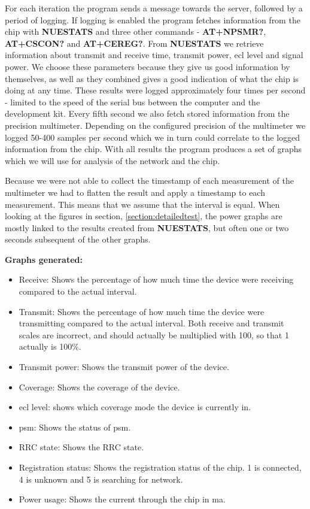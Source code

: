 \documentclass[USenglish]{ifimaster}  %
\begin{document}
For each iteration the program sends a message towards the server, followed by a period of logging. If logging is enabled the program fetches information from the chip with \textbf{NUESTATS} and three other commands - \textbf{AT+NPSMR?}, \textbf{AT+CSCON?} and \textbf{AT+CEREG?}. From \textbf{NUESTATS} we retrieve information about transmit and receive time, transmit power, \acrshort{ecl} level and signal power. We choose these parameters because they give us good information by themselves, as well as they combined gives a good indication of what the chip is doing at any time. These results were logged approximately four times per second - limited to the speed of the serial bus between the computer and the development kit. Every fifth second we also fetch stored information from the precision multimeter. Depending on the configured precision of the multimeter we logged 50-400 samples per second which we in turn could correlate to the logged information from the chip. With all results the program produces a set of graphs which we will use for analysis of the network and the chip.

Because we were not able to collect the timestamp of each measurement of the multimeter we had to flatten the result and apply a timestamp to each measurement. This means that we assume that the interval is equal. When looking at the figures in section, \vref{section:detailedtest}, the power graphs are mostly linked to the results created from \textbf{NUESTATS}, but often one or two seconds subsequent of the other graphs.

\textbf{Graphs generated:}
\begin{itemize}
  \item Receive: Shows the percentage of how much time the device were receiving compared to the actual interval.
  \item Transmit: Shows the percentage of how much time the device were transmitting compared to the actual interval. Both receive and transmit scales are incorrect, and should actually be multiplied with 100, so that 1 actually is 100\%.
  \item Transmit power: Shows the transmit power of the device.
  \item Coverage: Shows the coverage of the device.
  \item \acrshort{ecl} level: shows which coverage mode the device is currently in.
  \item \acrshort{psm}: Shows the status of \acrshort{psm}.
  \item RRC state: Shows the RRC state.
  \item Registration status: Shows the registration status of the chip. 1 is connected, 4 is unknown and 5 is searching for network.
  \item Power usage: Shows the current through the chip in \acrshort{ma}.
\end{itemize}
\end{document}
